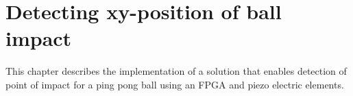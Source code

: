 \chapter{Detecting xy-position of ball impact}
This chapter describes the implementation of a solution that enables detection of point of impact for a ping pong ball using an FPGA and piezo electric elements.





